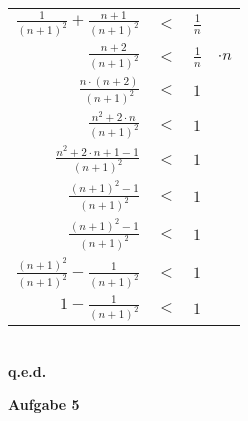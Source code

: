 \documentclass[a4paper]{scrartcl}
\begin{document}
\begin{flushleft}
\begin{center}
\begin{tabular}{rcl | l}
		$\frac{1}{(n+1)^2}+\frac{n+1}{(n+1)^2}$ & $<$ & $\frac{1}{n}$ & \\
		$\frac{n+2}{(n+1)^2}$ & $<$ & $\frac{1}{n}$ & $\cdot n$\\
		$\frac{n\cdot(n+2)}{(n+1)^2}$ & $<$ & $1$ & \\
		$\frac{n^2+2\cdot n}{(n+1)^2}$ & $<$ & $1$ & \\
		$\frac{n^2+2\cdot n+1-1}{(n+1)^2}$ & $<$ & $1$ & \\
		$\frac{(n+1)^2-1}{(n+1)^2}$ & $<$ & $1$ & \\
		$\frac{(n+1)^2-1}{(n+1)^2}$ & $<$ & $1$ & \\
		$\frac{(n+1)^2}{(n+1)^2}-\frac{1}{(n+1)^2}$ & $<$ & $1$ & \\
		$1-\frac{1}{(n+1)^2}$ & $<$ & $1$ & \\
		\end{tabular}\\[1em]
		\textbf{q.e.d.}\\
		\end{center}
	\end{flushleft}
	\begin{flushleft}
		\textbf{Aufgabe 5}\\
	\end{flushleft}
\end{document}
